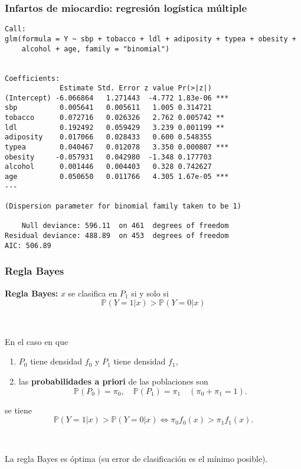 \documentclass{beamer}
\begin{document}
\begin{frame}
\frametitle{Infartos de miocardio: regresión logística múltiple}

{\scriptsize
\begin{verbatim}
Call:
glm(formula = Y ~ sbp + tobacco + ldl + adiposity + typea + obesity + 
    alcohol + age, family = "binomial")
 

Coefficients:
             Estimate Std. Error z value Pr(>|z|)    
(Intercept) -6.066864   1.271443  -4.772 1.83e-06 ***
sbp          0.005641   0.005611   1.005 0.314721    
tobacco      0.072716   0.026326   2.762 0.005742 ** 
ldl          0.192492   0.059429   3.239 0.001199 ** 
adiposity    0.017066   0.028433   0.600 0.548355    
typea        0.040467   0.012078   3.350 0.000807 ***
obesity     -0.057931   0.042980  -1.348 0.177703    
alcohol      0.001446   0.004403   0.328 0.742627    
age          0.050650   0.011766   4.305 1.67e-05 ***
---

(Dispersion parameter for binomial family taken to be 1)

    Null deviance: 596.11  on 461  degrees of freedom
Residual deviance: 488.89  on 453  degrees of freedom
AIC: 506.89
\end{verbatim}
}

\end{frame}
\begin{frame}
\frametitle{Regla Bayes}



\textbf{Regla Bayes:}
$x$ se clasifica en $P_1$ si y solo si 
\[
\mathbb{P}(Y=1|x)>\mathbb{P}(Y=0|x) 
\]

\



En el caso en que 
\begin{enumerate}
\item $P_0$ tiene densidad $f_0$ y  $P_1$ tiene densidad $f_1$,
\item las \textbf{probabilidades a priori} de las poblaciones son
$$\mathbb{P}(P_0)=\pi_0,\quad \mathbb{P}(P_1)=\pi_1\quad (\pi_0+\pi_1=1).$$
\end{enumerate}
se tiene
\[
\mathbb{P}(Y=1|x)>\mathbb{P}(Y=0|x) \Leftrightarrow \pi_0 f_0(x)>\pi_1 f_1(x).
\]

\

La regla Bayes es óptima (su error de clasificación es el mínimo posible).


\end{frame}
\end{document}
